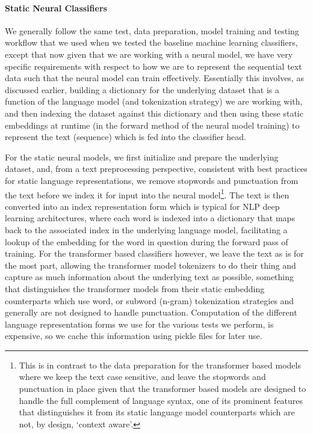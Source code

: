 \documentclass[final]{clv2025}
\begin{document}
\paragraph{Static Neural Classifiers}
We generally follow the same test, data preparation, model training and testing workflow that we used when we tested the baseline machine learning classifiers, except that now given that we are working with a neural model, we have very specific requirements with respect to how we are to represent the sequential text data such that the neural model can train effectively. Essentially this involves, as discussed earlier, building a dictionary for the underlying dataset that is a function of the language model (and tokenization strategy) we are working with, and then indexing the dataset against this dictionary and then using these static embeddings at runtime (in the forward method of the neural model training) to represent the text (sequence) which is fed into the classifier head.

For the static neural models, we first initialize and prepare the underlying dataset, and, from a text preprocessing perspective, consistent with best practices for static language representations, we remove stopwords and punctuation from the text before we index it for input into the neural model\footnote{This is in contrast to the data preparation for the transformer based models where we keep the text case sensitive, and leave the stopwords and punctuation in place given that the transformer based models are designed to handle the full complement of language syntax, one of its prominent features that distinguishes it from its static language model counterparts which are not, by design, ‘context aware’.}. The text is then converted into an index representation form which is typical for NLP deep learning architectures, where each word is indexed into a dictionary that maps back to the associated index in the underlying language model, facilitating a lookup of the embedding for the word in question during the forward pass of training. For the transformer based classifiers however, we leave the text as is for the most part, allowing the transformer model tokenizers to do their thing and capture as much information about the underlying text as possible, something that distinguishes the transformer models from their static embedding counterparts which use word, or subword (n-gram) tokenization strategies and generally are not designed to handle punctuation. Computation of the different language representation forms we use for the various tests we perform, is expensive, so we cache this information using pickle files for later use. 
\end{document}
